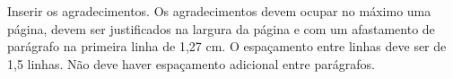 \begin{agradece}	%

Inserir os agradecimentos. Os agradecimentos devem ocupar no máximo uma página, devem ser justificados na largura da página e com um afastamento de parágrafo na primeira linha de 1,27 cm. O espaçamento entre linhas deve ser de 1,5 linhas. Não deve haver espaçamento adicional entre parágrafos.

\end{agradece}

